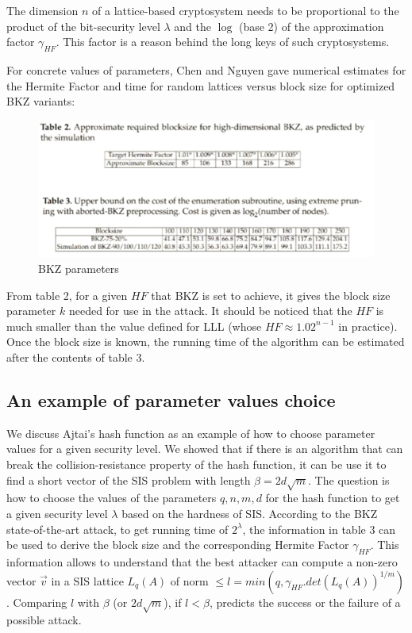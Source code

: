 \begin{remark}
  The dimension $n$ of a lattice-based cryptosystem needs to be proportional to
  the product of the bit-security level $\lambda$ and the $\log$ (base 2) of the
  approximation factor $\gamma_{HF}$.  This factor is a reason behind the long
  keys of such cryptosystems.
  \label{rem:dimension}
\end{remark}

For concrete values of parameters, Chen and Nguyen \cite{chen2011bkz} gave
numerical estimates for the Hermite Factor and time for random lattices versus block
size for optimized BKZ variants:

\begin{figure}[h]
  \centering \includegraphics[scale=0.3]{bkzparams}
  \caption{BKZ parameters}
  \label{fig:BKZParams}
\end{figure}

From table 2, for a given $HF$ that BKZ is set to achieve, it gives the
block size parameter $k$ needed for use in the attack. It should be noticed that the $HF$ is much
smaller than the value defined for LLL (whose $HF \approx 1.02^{n-1}$ in
practice). Once the block size is known, the running time of the algorithm can be estimated after the contents of table 3.

\subsection{An example of parameter values choice}
\label{sec:parameterChoice}
We discuss Ajtai's hash function as an example of how to choose parameter values for
a given security level. We showed that if there is an algorithm that can break the
collision-resistance property of the hash function, it can be use it to find a
short vector of the SIS problem with length $\beta = 2d\sqrt{m}$. The question
is how to choose the values of the parameters $q,n,m,d$ for the hash function to get a
given security level $\lambda$ based on the hardness of SIS. According to the
BKZ state-of-the-art attack, to get running time of $2^\lambda$, the information in
table 3 can be used to derive the block size and the corresponding Hermite Factor $\gamma_{HF}$.
This information allows to understand that the best attacker can compute a non-zero vector $\vec{v}$ in a SIS
lattice $L_q(A)$ of norm $\leq l = min(q, \gamma_{HF}.det(L_q(A))^{1/m})$. 
Comparing $l$ with $\beta$ (or $2d\sqrt{m}$), if $l < \beta$, predicts the success or the failure of a possible attack.

